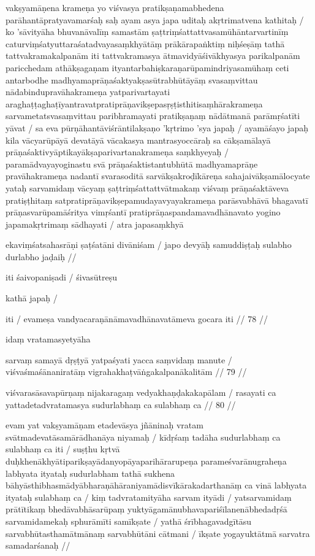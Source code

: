 vakṣyamāṇena krameṇa yo viśvasya pratikṣaṇamabhedena parāhantāpratyavamarśaḥ saḥ ayam asya japa uditaḥ akṛtrimatvena kathitaḥ  / ko 'sāvityāha bhuvanāvalīṃ samastām ṣaṭtriṃśattattvasamūhāntarvartinīṃ caturviṃśatyuttaraśatadvayasaṃkhyātāṃ prākārapaṅktiṃ niḥśeṣāṃ tathā tattvakramakalpanām iti tattvakramasya ātmavidyāśivākhyasya parikalpanām paricchedam athākṣagaṇam ityantarbahiṣkaraṇarūpamindriyasamūhaṃ ceti antarbodhe madhyamaprāṇaśaktyakṣasūtrabhūtāyāṃ svasaṃvittau nādabindupravāhakrameṇa yatparivartayati araghaṭṭaghaṭīyantravatpratiprāṇavikṣepasṛṣṭisthitisaṃhārakrameṇa sarvametatsvasaṃvittau paribhramayati pratikṣaṇaṃ nādātmanā parāmṛśatīti yāvat  / sa eva pūrṇāhantāviśrāntilakṣaṇo 'kṛtrimo 'sya japaḥ  / ayamāśayo japaḥ kila vācyarūpāyā devatāyā vācakasya mantrasyoccāraḥ sa cākṣamālayā prāṇaśaktivyāptikayākṣaparivartanakrameṇa saṃkhyeyaḥ  / paramādvayayoginastu svā prāṇaśaktistantubhūtā madhyamaprāṇe pravāhakrameṇa nadantī svarasoditā sarvākṣakroḍīkāreṇa sahajaivākṣamālocyate yataḥ sarvamidaṃ vācyaṃ ṣaṭtriṃśattattvātmakaṃ viśvaṃ prāṇaśaktāveva pratiṣṭhitaṃ satpratiprāṇavikṣepamudayavyayakrameṇa parāsvabhāvā bhagavatī prāṇasvarūpamāśritya vimṛśantī pratiprāṇaspandamavadhānavato yogino japamakṛtrimaṃ sādhayati  / atra japasaṃkhyā

ekaviṃśatsahasrāṇi ṣaṭśatāni divāniśam  /
japo devyāḥ samuddiṣṭaḥ sulabho durlabho jaḍaiḥ  //

iti śaivopaniṣadi  / śivasūtreṣu

kathā japaḥ  /

iti  / evameṣa vandyacaraṇānāmavadhānavatāmeva gocara iti  // 78  //

idaṃ vratamasyetyāha

sarvaṃ samayā dṛṣṭyā yatpaśyati yacca saṃvidaṃ manute  /
viśvaśmaśānaniratāṃ vigrahakhaṭvāṅgakalpanākalitām  // 79  //

viśvarasāsavapūrṇaṃ nijakaragaṃ vedyakhaṇḍakakapālam  /
rasayati ca yattadetadvratamasya sudurlabhaṃ ca sulabhaṃ ca  // 80  //

evam yat vakṣyamāṇam etadevāsya jñāninaḥ vratam svātmadevatāsamārādhanāya niyamaḥ  / kīdṛśaṃ tadāha sudurlabhaṃ ca sulabhaṃ ca iti  / suṣṭhu kṛtvā duḥkhenākhyātiparikṣayādanyopāyaparihārarupeṇa parameśvarānugraheṇa labhyata ityataḥ sudurlabham tathā sukhena bāhyāsthibhasmādyābharaṇāhāraniyamādisvīkārakadarthanāṃ ca vinā labhyata ityataḥ sulabhaṃ ca  / kiṃ tadvratamityāha sarvam ityādi  / yatsarvamidaṃ prātītikaṃ bhedāvabhāsarūpaṃ yuktyāgamānubhavapariśīlanenābhedadṛśā sarvamidamekaḥ sphurāmīti samīkṣate  / yathā śrībhagavadgītāsu
sarvabhūtasthamātmānaṃ sarvabhūtāni cātmani  /
īkṣate yogayuktātmā sarvatra samadarśanaḥ  //

